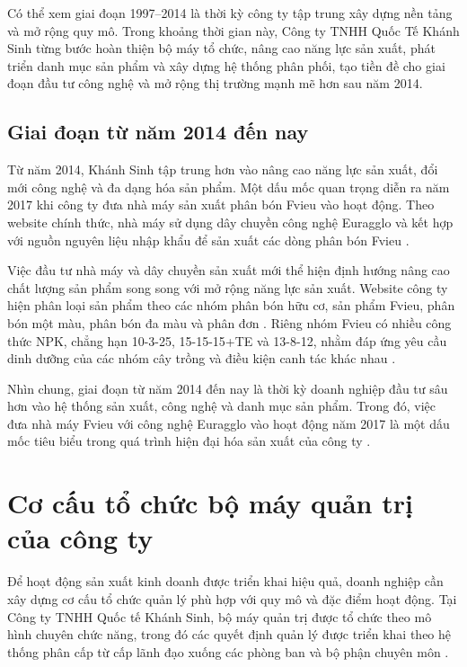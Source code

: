 Có thể xem giai đoạn 1997–2014 là thời kỳ công ty tập trung xây dựng nền tảng và mở rộng quy mô. Trong khoảng thời gian này, Công ty TNHH Quốc Tế Khánh Sinh từng bước hoàn thiện bộ máy tổ chức, nâng cao năng lực sản xuất, phát triển danh mục sản phẩm và xây dựng hệ thống phân phối, tạo tiền đề cho giai đoạn đầu tư công nghệ và mở rộng thị trường mạnh mẽ hơn sau năm 2014.

\subsection{Giai đoạn từ năm 2014 đến nay}
Từ năm 2014, Khánh Sinh tập trung hơn vào nâng cao năng lực sản xuất, đổi mới công nghệ và đa dạng hóa sản phẩm. 
Một dấu mốc quan trọng diễn ra năm 2017 khi công ty đưa nhà máy sản xuất phân bón Fvieu vào hoạt động. 
Theo website chính thức, nhà máy sử dụng dây chuyền công nghệ Euragglo và kết hợp với nguồn nguyên liệu nhập khẩu để sản xuất các dòng phân bón Fvieu \cite{company-internal-documents}.

Việc đầu tư nhà máy và dây chuyền sản xuất mới thể hiện định hướng nâng cao chất lượng sản phẩm song song với mở rộng năng lực sản xuất. 
Website công ty hiện phân loại sản phẩm theo các nhóm phân bón hữu cơ, sản phẩm Fvieu, phân bón một màu, phân bón đa màu và phân đơn \cite{company-internal-documents}. 
Riêng nhóm Fvieu có nhiều công thức NPK, chẳng hạn 10-3-25, 15-15-15+TE và 13-8-12, nhằm đáp ứng yêu cầu dinh dưỡng của các nhóm cây trồng và điều kiện canh tác khác nhau \cite{company-internal-documents}.

Nhìn chung, giai đoạn từ năm 2014 đến nay là thời kỳ doanh nghiệp đầu tư sâu hơn vào hệ thống sản xuất, công nghệ và danh mục sản phẩm. 
Trong đó, việc đưa nhà máy Fvieu với công nghệ Euragglo vào hoạt động năm 2017 là một dấu mốc tiêu biểu trong quá trình hiện đại hóa sản xuất của công ty \cite{company-internal-documents}.

\section{Cơ cấu tổ chức bộ máy quản trị của công ty}
Để hoạt động sản xuất kinh doanh được triển khai hiệu quả, doanh nghiệp cần xây dựng cơ cấu tổ chức quản lý phù hợp với quy mô và đặc điểm hoạt động. 
Tại Công ty TNHH Quốc tế Khánh Sinh, bộ máy quản trị được tổ chức theo mô hình chuyên chức năng, trong đó các quyết định quản lý được triển khai theo hệ thống phân cấp từ cấp lãnh đạo xuống các phòng ban và bộ phận chuyên môn \cite{company-internal-documents}.

